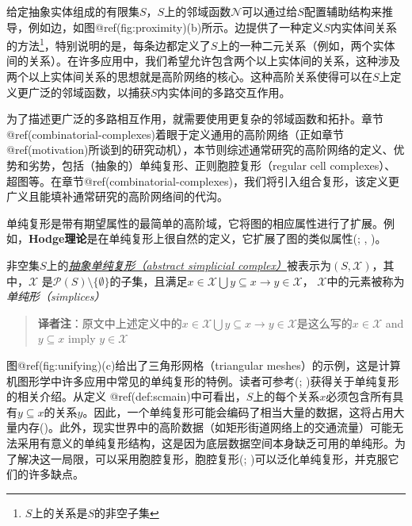 \documentclass[
  12pt,
]{krantz}
\begin{document}
给定抽象实体组成的有限集\(S\)，\(S\)上的邻域函数\(\mathcal{N}\)可以通过给\(S\)配置辅助结构来推导，例如边，如图@ref(fig:proximity)(b)所示。边提供了一种定义\(S\)内实体间关系的方法\footnote{\(S\)上的关系是\(S\)的非空子集}，特别说明的是，每条边都定义了\(S\)上的一种二元关系（例如，两个实体间的关系）。在许多应用中，我们希望允许包含两个以上实体间的关系，这种涉及两个以上实体间关系的思想就是高阶网络的核心。这种高阶关系使得可以在\(S\)上定义更广泛的邻域函数，以捕获\(S\)内实体间的多路交互作用。

为了描述更广泛的多路相互作用，就需要使用更复杂的邻域函数和拓扑。章节
@ref(combinatorial-complexes)着眼于定义通用的高阶网络（正如章节@ref(motivation)所谈到的研究动机），本节则综述通常研究的高阶网络的定义、优势和劣势，包括（抽象的）单纯复形、正则胞腔复形（regular
cell
complexes）、超图等。在章节@ref(combinatorial-complexes)，我们将引入组合复形，该定义更广义且能填补通常研究的高阶网络间的代沟。

单纯复形是带有期望属性的最简单的高阶域，它将图的相应属性进行了扩展。例如，\textbf{Hodge理论}是在单纯复形上很自然的定义，它扩展了图的类似属性(; , )。

\label{scmain}
非空集\(S\)上的\href{https://app.vectary.com/p/4HZRioKH7lZ2jWESIBrjhf}{\emph{抽象单纯复形（abstract
simplicial complex）}}被表示为\((S,\mathcal{X})\)，其中，\(\mathcal{X}\)
是\(\mathcal{P}(S) \setminus \{\emptyset\}\)的子集，且满足\(x \in \mathcal{X} \bigcup y \subseteq x \rightarrow y \in \mathcal{X}\)，
\(\mathcal{X}\)中的元素被称为\emph{单纯形（simplices）}

\begin{glossarybox}

\begin{quote}
\textbf{译者注}：原文中上述定义中的\(x \in \mathcal{X} \bigcup y \subseteq x \rightarrow y \in \mathcal{X}\)是这么写的\(x \in \mathcal{X}\)
and \(y \subseteq x\) imply \(y \in \mathcal{X}\)
\end{quote}

\end{glossarybox}

图@ref(fig:unifying)(c)给出了三角形网格（triangular
meshes）的示例，这是计算机图形学中许多应用中常见的单纯复形的特例。读者可参考(; )获得关于单纯复形的相关介绍。从定义
@ref(def:scmain)中可看出，\(S\)上的每个关系\(x\)必须包含所有具有\(y\subseteq x\)的关系\(y\)。因此，一个单纯复形可能会编码了相当大量的数据，这将占用大量内存()。此外，现实世界中的高阶数据（如矩形街道网络上的交通流量）可能无法采用有意义的单纯复形结构，这是因为底层数据空间本身缺乏可用的单纯形。为了解决这一局限，可以采用胞腔复形，胞腔复形(; )可以泛化单纯复形，并克服它们的许多缺点。
\end{document}
